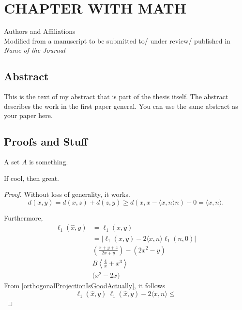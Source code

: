 \newcommand{\RipsD}{\operatorname{Rips}_1}
\newcommand{\Rips}{\operatorname{Rips}}
\newcommand{\ver}{\operatorname{ver}}
\newcommand{\diam}{\operatorname{Diam}}
\newcommand{\midR}{\operatorname{mid}}
\newcommand{\dN}{N_1^*}

\chapter{CHAPTER WITH MATH}
\begin{center}
    Authors and Affiliations \\
    Modified from a manuscript to be submitted to/ under review/ published in \textit{Name of the Journal}
\end{center}

\section{Abstract}
This is the text of my abstract that is part of the thesis itself.
The abstract describes the work in the first paper general. You can use the same abstract as your paper here.
\section{Proofs and Stuff}
\begin{definition}
    A set $A$ is something.
\end{definition}

\begin{lemma}
    If cool, then great.
\end{lemma}
\begin{proof}
    Without loss of generality, it works.
    \begin{equation}
        \label{orthogonalProjectionIsGoodActually}
        d(x,y)= d(x,z)+d(z,y) \geq d(x,x-\langle x,n\rangle n )+0 = \langle x,n\rangle.
    \end{equation}

    Furthermore,
    \begin{align}
        \ell_1(\hat{x},y) & = \ell_1 (x,y)                                        \\
                          & =|\ell_1(x,y)-2\langle x,n\rangle \ell_1(n,0)|        \\
                          & \left(\frac{x+y+z}{2x+y}\right) - \left(2x^2-y\right) \\
                          & B\left\langle \frac{4}{x}+x^3\right\rangle            \\
                          & \Bigg(x^2-2x\Bigg)
    \end{align}
    From \autoref{orthogonalProjectionIsGoodActually}, it follows \[\ell_1(\hat{x},y)\ \ell_1(\hat{x},y)-2\langle x,n\rangle \leq\]
\end{proof}

